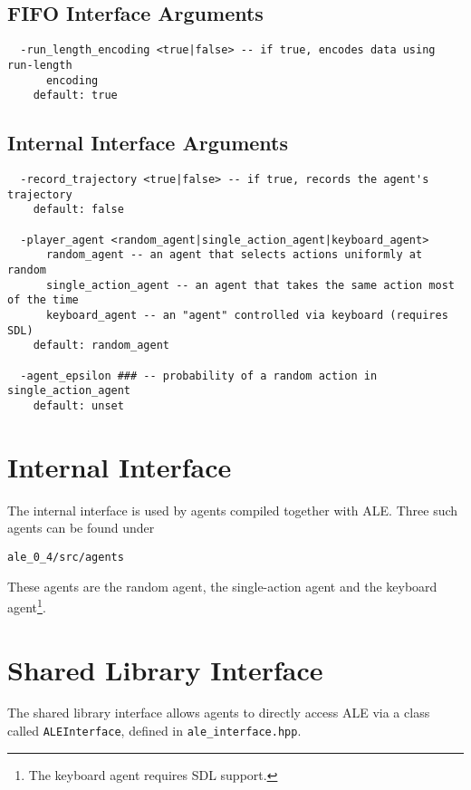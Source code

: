 \documentclass[12pt]{article}
\begin{document}
\subsection{FIFO Interface Arguments}

\small{
\begin{verbatim}
  -run_length_encoding <true|false> -- if true, encodes data using run-length
      encoding
    default: true
\end{verbatim}
}

\subsection{Internal Interface Arguments}

\small{
\begin{verbatim}
  -record_trajectory <true|false> -- if true, records the agent's trajectory
    default: false

  -player_agent <random_agent|single_action_agent|keyboard_agent>
      random_agent -- an agent that selects actions uniformly at random
      single_action_agent -- an agent that takes the same action most of the time
      keyboard_agent -- an "agent" controlled via keyboard (requires SDL)
    default: random_agent

  -agent_epsilon ### -- probability of a random action in single_action_agent
    default: unset

\end{verbatim}
}

\section{Internal Interface}\label{sec:internal_interface}

The internal interface is used by agents compiled together with ALE. Three such agents
can be found under 

\begin{verbatim}
ale_0_4/src/agents
\end{verbatim}

These agents are the random agent, the single-action agent and the keyboard agent\footnote{The keyboard agent requires SDL support.}.

\section{Shared Library Interface}\label{sec:shared_library_interface}

The shared library interface allows agents to directly access ALE via a class called
\verb+ALEInterface+, defined in \verb+ale_interface.hpp+. 
\end{document}

